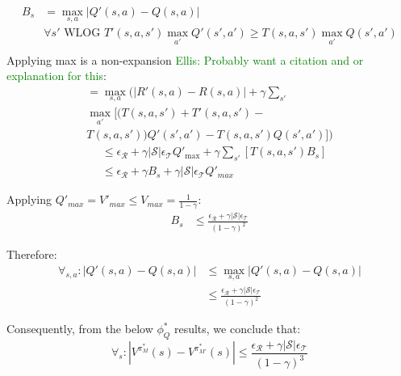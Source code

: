 \documentclass{article}
\newcommand\enote[1]{\textcolor{green}{Ellis: #1}}
\begin{document}
\begin{align*}
B_{s} &= \max_{s,a}|Q'(s,a)-Q(s,a)|\\
&\forall s' \text{ WLOG } T'(s,a,s')\max_{a'}Q'(s',a') \geq T(s,a,s')\max_{a'}Q(s',a')\\
\end{align*}
Applying max is a non-expansion \enote{Probably want a citation and or explanation for this}:
\begin{multline}
=\max_{s,a}(|R'(s,a)-R(s,a)| + \gamma \sum_{s'} \\
\max_{a'} [(T(s,a,s')+T'(s,a,s')- \\ T(s,a,s'))Q'(s', a')-T(s,a,s')Q(s',a')])
\end{multline}
\begin{align*}
&\leq \epsilon_{\mathcal{R}}+\gamma |\mathcal{S}|\epsilon_{\mathcal{T}}Q'_{\text{max}} + \gamma \sum_{s'}\left[ T(s,a,s') B_s\right]\\
&\leq \epsilon_{\mathcal{R}} + \gamma B_{s} + \gamma |\mathcal{S}|\epsilon_{\mathcal{T}}Q'_{max}
\end{align*}

Applying $Q'_{max}=V'_{max} \leq V_{max}=\frac{1}{1-\gamma}$:
\begin{align*}
B_{s} &\leq 
\frac
{{\epsilon_{\mathcal{R}}} + \gamma |\mathcal{S}|\epsilon_{\mathcal{T}}}
{(1-\gamma)^2}
\end{align*}

Therefore:
\begin{align*}
\forall_{s,a} : |Q'(s,a) - Q(s,a)| &\leq \max_{s,a}|Q'(s,a)-Q(s,a)| \\
&\leq  \frac{{\epsilon_{\mathcal{R}}} + \gamma |\mathcal{S}|\epsilon_{\mathcal{T}} }{(1-\gamma)^2}
\end{align*}

Consequently, from the below $\phi_Q^*$ results, we conclude that:
\begin{equation}
\forall_s : |V^{\pi^*_M}(s) - V^{\pi^*_{M'}}(s)| \leq \frac{{\epsilon_{\mathcal{R}}} + \gamma |\mathcal{S}|\epsilon_{\mathcal{T}}}{(1-\gamma)^3}
\end{equation}
\end{document}
